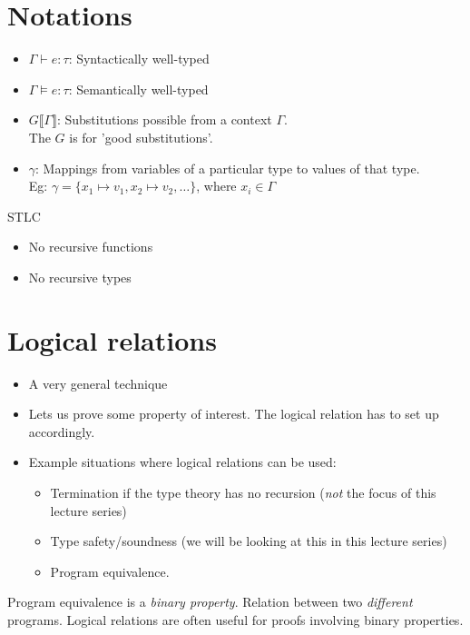 \documentclass{article}
\title{}
\author{}
\date{}
\newcommand\sem[1]{\llbracket #1 \rrbracket}
\begin{document}
\section{Notations}
\begin{itemize}
\item $\Gamma \vdash e : \tau$: Syntactically well-typed
\item $\Gamma \models e : \tau$: Semantically well-typed
\item $G\sem{\Gamma}$:
  Substitutions possible from a context $\Gamma$.\\
  The $G$ is for 'good substitutions'.
\item $\gamma$:
  Mappings from variables of a particular type to values
  of that type.\\
  Eg: $\gamma = \{x_1 \mapsto v_1, x_2 \mapsto v_2, \ldots \}$, where
  $x_i \in \Gamma$
\end{itemize}

STLC
\begin{itemize}
\item No recursive functions
\item No recursive types
\end{itemize}

\section{Logical relations}
\begin{itemize}
\item
  A very general technique
\item
  Lets us prove some property of interest.
  The logical relation has to set up accordingly.
\item
  Example situations where logical relations can be used:
  \begin{itemize}
  \item
    Termination if the type theory has no recursion (\emph{not}
    the focus of this lecture series)
  \item
    Type safety/soundness (we will be looking at this in this
    lecture series)
  \item
    Program equivalence.
  \end{itemize}
\end{itemize}

Program equivalence is a \emph{binary property}. Relation
between two \emph{different} programs.
Logical relations are often useful for proofs involving binary
properties.
\end{document}
